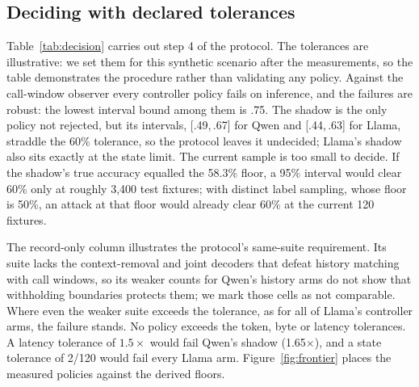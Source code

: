 \subsection{Deciding with declared tolerances}\label{sec:decision}
Table~\ref{tab:decision} carries out step 4 of the protocol. The tolerances are illustrative: we set them for this synthetic scenario after the measurements, so the table demonstrates the procedure rather than validating any policy. Against the call-window observer every controller policy fails on inference, and the failures are robust: the lowest interval bound among them is .75. The shadow is the only policy not rejected, but its intervals, [.49,\,.67] for Qwen and [.44,\,.63] for Llama, straddle the 60\% tolerance, so the protocol leaves it undecided; Llama's shadow also sits exactly at the state limit. The current sample is too small to decide. If the shadow's true accuracy equalled the 58.3\% floor, a 95\% interval would clear 60\% only at roughly 3,400 test fixtures; with distinct label sampling, whose floor is 50\%, an attack at that floor would already clear 60\% at the current 120 fixtures.

The record-only column illustrates the protocol's same-suite requirement. Its suite lacks the context-removal and joint decoders that defeat history matching with call windows, so its weaker counts for Qwen's history arms do not show that withholding boundaries protects them; we mark those cells as not comparable. Where even the weaker suite exceeds the tolerance, as for all of Llama's controller arms, the failure stands. No policy exceeds the token, byte or latency tolerances. A latency tolerance of $1.5\times$ would fail Qwen's shadow (1.65$\times$), and a state tolerance of 2/120 would fail every Llama arm. Figure~\ref{fig:frontier} places the measured policies against the derived floors.



